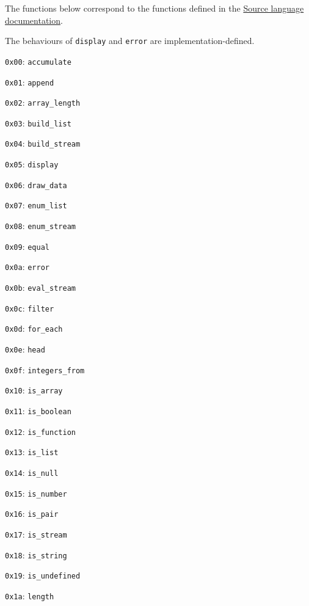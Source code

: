 The functions below correspond to the functions defined in the
\href{https://sicp.comp.nus.edu.sg/source/source_4/}{Source language
documentation}.

The behaviours of \texttt{display} and \texttt{error} are
implementation-defined.

\begin{tightlist}
\item
  \texttt{0x00}: \texttt{accumulate}
\item
  \texttt{0x01}: \texttt{append}
\item
  \texttt{0x02}: \texttt{array\_length}
\item
  \texttt{0x03}: \texttt{build\_list}
\item
  \texttt{0x04}: \texttt{build\_stream}
\item
  \texttt{0x05}: \texttt{display}
\item
  \texttt{0x06}: \texttt{draw\_data}
\item
  \texttt{0x07}: \texttt{enum\_list}
\item
  \texttt{0x08}: \texttt{enum\_stream}
\item
  \texttt{0x09}: \texttt{equal}
\item
  \texttt{0x0a}: \texttt{error}
\item
  \texttt{0x0b}: \texttt{eval\_stream}
\item
  \texttt{0x0c}: \texttt{filter}
\item
  \texttt{0x0d}: \texttt{for\_each}
\item
  \texttt{0x0e}: \texttt{head}
\item
  \texttt{0x0f}: \texttt{integers\_from}
\item
  \texttt{0x10}: \texttt{is\_array}
\item
  \texttt{0x11}: \texttt{is\_boolean}
\item
  \texttt{0x12}: \texttt{is\_function}
\item
  \texttt{0x13}: \texttt{is\_list}
\item
  \texttt{0x14}: \texttt{is\_null}
\item
  \texttt{0x15}: \texttt{is\_number}
\item
  \texttt{0x16}: \texttt{is\_pair}
\item
  \texttt{0x17}: \texttt{is\_stream}
\item
  \texttt{0x18}: \texttt{is\_string}
\item
  \texttt{0x19}: \texttt{is\_undefined}
\item
  \texttt{0x1a}: \texttt{length}
\item

\end{tightlist}

